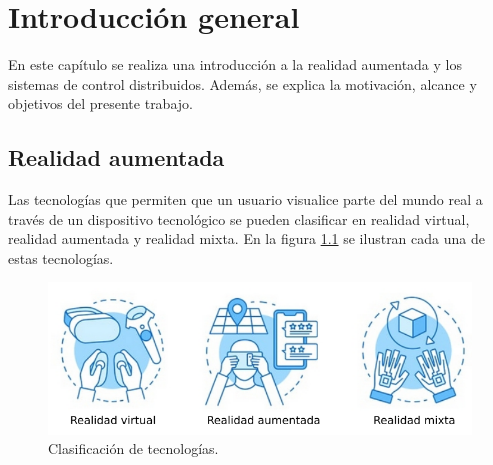 
\chapter{Introducción general} %

\label{Chapter1} %
\label{IntroGeneral}


\newcommand{\keyword}[1]{\textbf{#1}}
\newcommand{\tabhead}[1]{\textbf{#1}}
\newcommand{\code}[1]{\texttt{#1}}
\newcommand{\file}[1]{\texttt{\bfseries#1}}
\newcommand{\option}[1]{\texttt{\itshape#1}}
\newcommand{\grados}{$^{\circ}$}



En este capítulo se realiza una introducción a la realidad aumentada y los sistemas de control distribuidos. Además, se explica la motivación, alcance y objetivos del presente trabajo.

\section{Realidad aumentada}

Las tecnologías que permiten que un usuario visualice parte del mundo real a través de un dispositivo tecnológico se pueden clasificar en realidad virtual, realidad aumentada y realidad mixta. En la figura \ref{fig:realidades} se ilustran cada una de estas tecnologías.

\begin{figure}[htpb]
	\centering
	\includegraphics[width=\textwidth]{./Figures/realidades.png}
	\caption{Clasificación de tecnologías\protect\footnotemark.}
	\label{fig:realidades}
\end{figure}

